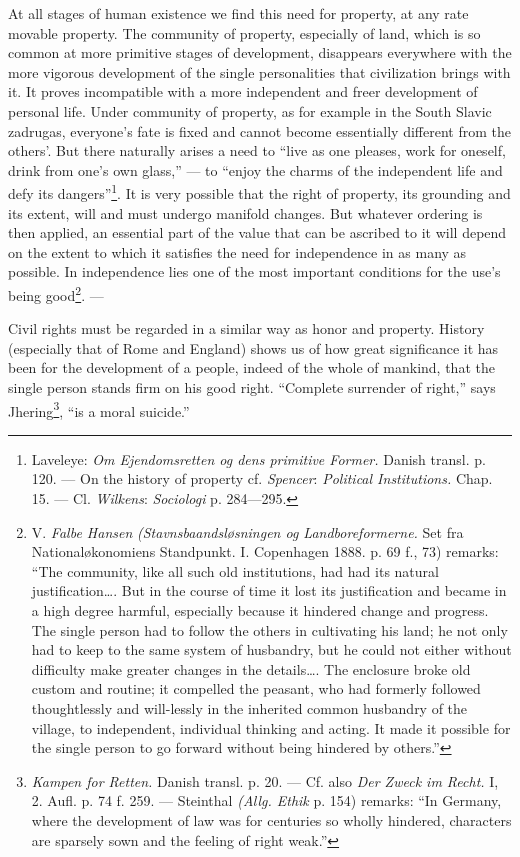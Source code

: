 \documentclass[12pt,a4paper,openany]{book}
\newcommand{\opage}[1]{\marginnote{\footnotesize\textit{[#1]}}}
\begin{document}
At all stages of human existence we find this need for property, at any rate movable property. The community of
property, especially of land, which is so common at more primitive stages of development, disappears everywhere with
the more vigorous development of the single personalities that civilization brings with it. It proves incompatible
with a more independent and freer development of personal life. Under community of property, as for example in the
South Slavic zadrugas, everyone's fate is fixed and cannot become essentially different from the others'. But there
naturally arises a need to ``live as one pleases, work for oneself, drink from one's own glass,'' --- to ``enjoy the
charms of the independent life and defy its dangers''\footnote[1]{Laveleye: \textit{Om Ejendomsretten og dens
primitive Former.} Danish transl. p. 120. --- On the history of property cf. \emph{Spencer}: \textit{Political
Institutions.} Chap. 15. --- Cl. \emph{Wilkens}: \textit{Sociologi} p. 284---295.}. It is very possible that the
right of property, its grounding and its extent, will and must undergo manifold changes. But whatever ordering is
then applied, an essential part of the value that can be ascribed to it will depend on the extent to which it
satisfies the need for independence in as many as possible. In independence lies one of the most important
conditions for the use's being good\footnote[2]{V. \emph{Falbe Hansen} \textit{(Stavnsbaandsløsningen og
Landboreformerne.} Set fra Nationaløkonomiens Standpunkt. I. Copenhagen 1888. p. 69 f., 73) remarks: ``The
community, like all such old institutions, had had its natural justification\dots{}. But in the course of time it
lost its justification and became in a high degree harmful, especially because it hindered change and progress. The
single person had to follow the others in cultivating his land; he not only had to keep to the same system of
husbandry, but he could not either without difficulty make greater changes in the details\dots{}. The enclosure broke
old custom and routine; it compelled the peasant, who had formerly followed thoughtlessly and will-lessly in the
inherited common husbandry of the village, to independent, individual thinking and acting. It made it possible for
the single person to go forward without being hindered by others.''}. ---

\opage{236}Civil rights must be regarded in a similar way as honor and property. History (especially that of Rome and
England) shows us of how great significance it has been for the development of a people, indeed of the whole of
mankind, that the single person stands firm on his good right. ``Complete surrender of right,'' says
Jhering\footnote[1]{\textit{Kampen for Retten.} Danish transl. p. 20. --- Cf. also \textit{Der Zweck im Recht.} I,
2. Aufl. p. 74 f. 259. --- Steinthal \textit{(Allg. Ethik} p. 154) remarks: ``In Germany, where the development of
law was for centuries so wholly hindered, characters are sparsely sown and the feeling of right weak.''}, ``is a moral
suicide.''
\end{document}
